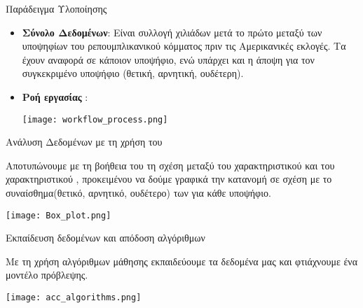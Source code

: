 \documentclass{beamer}
\begin{document}
\begin{frame}
\begin{flushleft}
{\color{blue}Παράδειγμα Υλοποίησης} 
\end{flushleft}
\vfill
\begin{itemize}
\item {\textbf{Σύνολο Δεδομένων}}: Είναι συλλογή χιλιάδων {} μετά το πρώτο {} μεταξύ των υποψηφίων του ρεπουμπλικανικού κόμματος πριν τις Αμερικανικές εκλογές. Τα {} έχουν αναφορά σε κάποιον υποψήφιο, ενώ υπάρχει και η άποψη για τον συγκεκριμένο υποψήφιο (θετική, αρνητική, ουδέτερη).
\item {\textbf{Ροή εργασίας {}}}:
\begin{table}[!h]
\begin{center}
\texttt{[image: workflow\_process.png]}
\end{center}
\end{table}
\end{itemize}
\end{frame}

\begin{frame}
\begin{flushleft}
{\color{blue}Ανάλυση Δεδομένων με τη χρήση του {}} 
\end{flushleft}
\vfill
\item Αποτυπώνουμε με τη βοήθεια του {} τη σχέση μεταξύ του χαρακτηριστικού {} και του χαρακτηριστικού {}, προκειμένου να δούμε γραφικά την κατανομή σε σχέση με το συναίσθημα(θετικό, αρνητικό, ουδέτερο) των {}  για κάθε υποψήφιο.
\vfill
\begin{table}[!h]
\begin{center}
\texttt{[image: Box\_plot.png]}
\end{center}
\end{table}
\end{frame}

\begin{frame}
\begin{flushleft}
{\color{blue}Εκπαίδευση δεδομένων και απόδοση αλγόριθμων} 
\end{flushleft}
\vfill
Με τη χρήση αλγόριθμων μάθησης {} εκπαιδεύουμε τα δεδομένα μας και φτιάχνουμε ένα μοντέλο πρόβλεψης.
\begin{table}[!h]
\begin{center}
\texttt{[image: acc\_algorithms.png]}
\end{center}
\end{table}
\end{frame}
\end{document}
